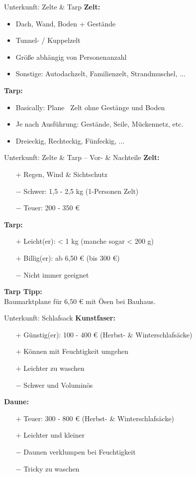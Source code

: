 \documentclass{beamer}
\newcommand{\tipp}[2][Tipp:]{\vspace{0.2cm}\textbf{#1:}\\#2}
\begin{document}
			\begin{frame}{Unterkunft: Zelte \& Tarp}
				\textbf{Zelt:}
				\begin{itemize}
					\item Dach, Wand, Boden + Gestände
					\item Tunnel- / Kuppelzelt
					\item Größe abhängig von Personenanzahl
					\item Sonstige: Autodachzelt, Familienzelt, Strandmuschel, ...
				\end{itemize}\pause
				\textbf{Tarp:}
				\begin{itemize}
					\item Basically: Plane \textrightarrow\ Zelt ohne Gestänge und Boden
					\item Je nach Ausführung: Gestände, Seile, Mückennetz, etc.
					\item Dreieckig, Rechteckig, Fünfeckig, ...
				\end{itemize}
			\end{frame}
			
			\begin{frame}{Unterkunft: Zelte \& Tarp -- Vor- \& Nachteile}
				\textbf{Zelt:}
				\begin{itemize}
					\item[$+$] Regen, Wind \& Sichtschutz
					\item[$-$] Schwer: 1,5 - 2,5 kg (1-Personen Zelt)
					\item[$-$] Teuer: 200 - 350 €
				\end{itemize}\pause
				\textbf{Tarp:}
				\begin{itemize}
					\item[$+$] Leicht(er): < 1 kg (manche sogar < 200 g)
					\item[$+$] Billig(er): ab 6,50 € (bis 300 €)
					\item[$-$] Nicht immer geeignet
				\end{itemize}\pause
				\tipp[Tarp Tipp]{Baumarktplane für 6,50 € mit Ösen bei Bauhaus.}
			\end{frame}
			
			\begin{frame}{Unterkunft: Schlafsack}
				\textbf{Kunstfaser:}
				\begin{itemize}
					\item[$+$] Günstig(er): 100 - 400 € (Herbst- \& Winterschlafsäcke)
					\item[$+$] Können mit Feuchtigkeit umgehen
					\item[$+$] Leichter zu waschen
					\item[$-$] Schwer und Voluminös
				\end{itemize}\pause
				\textbf{Daune:}
				\begin{itemize}
					\item[$+$] Teuer: 300 - 800 € (Herbst- \& Winterschlafsäcke)
					\item[$+$] Leichter und kleiner
					\item[$-$] Daunen verklumpen bei Feuchtigkeit
					\item[$-$] Tricky zu waschen
				\end{itemize}
			\end{frame}
			
\end{document}
